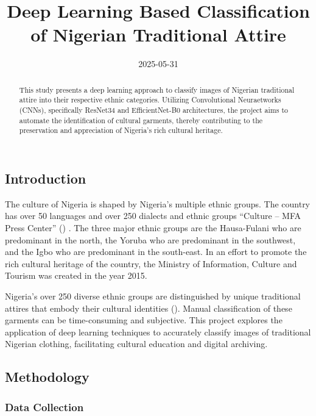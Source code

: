 \documentclass[
  letterpaper,
  DIV=11,
  numbers=noendperiod]{scrartcl}
\title{Deep Learning Based Classification of Nigerian Traditional
Attire}
\author{Naziru Abdussalam Ibrahim \and Ahmad Saad \and Abdulwasiu
Bamidele Popoola \and Taiwo Soffiyah Abass \and Ayodeji
Akande \and Shamsu Abdullahi \and Abubakar Sadiq Sulaiman \and Yahya
Abdurrazaq \and }
\date{2025-05-31}
\begin{document}
\maketitle
\begin{abstract}
This study presents a deep learning approach to classify images of
Nigerian traditional attire into their respective ethnic categories.
Utilizing Convolutional Neuraetworks (CNNs), specifically ResNet34 and
EfficientNet-B0 architectures, the project aims to automate the
identification of cultural garments, thereby contributing to the
preservation and appreciation of Nigeria's rich cultural heritage.
\end{abstract}


\subsection{Introduction}\label{introduction}

The culture of Nigeria is shaped by Nigeria's multiple ethnic groups.
The country has over 50 languages and over 250 dialects and ethnic
groups {``Culture -- {MFA} {Press} {Center}''}
() . The three major ethnic
groups are the Hausa-Fulani who are predominant in the north, the Yoruba
who are predominant in the southwest, and the Igbo who are predominant
in the south-east. In an effort to promote the rich cultural heritage of
the country, the Ministry of Information, Culture and Tourism was
created in the year 2015.

Nigeria's over 250 diverse ethnic groups are distinguished by unique
traditional attires that embody their cultural identities
(). Manual classification of these garments can be
time-consuming and subjective. This project explores the application of
deep learning techniques to accurately classify images of traditional
Nigerian clothing, facilitating cultural education and digital
archiving.

\subsection{Methodology}\label{methodology}

\subsubsection{Data Collection}\label{data-collection}
\end{document}
